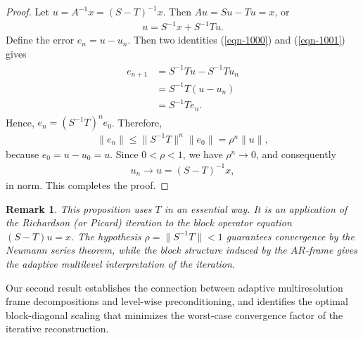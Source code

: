 \documentclass[10pt,a4paper]{amsart}
\newtheorem{rem}[thm]{Remark}
\begin{document}
\begin{proof}
Let $u=A^{-1}x=(S-T)^{-1}x$. Then $Au=Su-Tu=x$, or
\begin{eqnarray} \label{eqn-1001}
u=S^{-1}x+S^{-1}Tu.
\end{eqnarray}
Define the error $e_n=u-u_n$. Then two identities (\ref{eqn-1000})
and (\ref{eqn-1001}) gives
\begin{eqnarray*}
\begin{aligned} e_{n+1} &=
S^{-1}Tu-S^{-1}Tu_n\\ &= S^{-1}T(u-u_n)\\ &= S^{-1}Te_n.
\end{aligned}
\end{eqnarray*}
Hence, $e_n=(S^{-1}T)^ne_0$. Therefore,
\begin{eqnarray*}
\|e_n\| \le \|S^{-1}T\|^n\|e_0\| = \rho^n\|u\|,
\end{eqnarray*}
because $e_0=u-u_0=u$. Since $0<\rho<1$, we have
$\rho^n\longrightarrow0$, and consequently
\begin{eqnarray*}
u_n\longrightarrow u=(S-T)^{-1}x,
\end{eqnarray*}
in norm. This completes the proof.
\end{proof}
\begin{rem}
This proposition uses $T$ in an essential way. It is an
application of the Richardson (or Picard) iteration
\cite{Richard,Yousef} to the block operator equation $(S-T)u=x$.
The hypothesis $\rho=\|S^{-1}T\|<1$ guarantees convergence by the
Neumann series theorem, while the block structure induced by the
$AR$-frame gives the adaptive multilevel interpretation of the
iteration.
\end{rem}

Our second result establishes the connection between adaptive
multiresolution frame decompositions and level-wise
preconditioning, and identifies the optimal block-diagonal scaling
that minimizes the worst-case convergence factor of the iterative
reconstruction.
\end{document}
